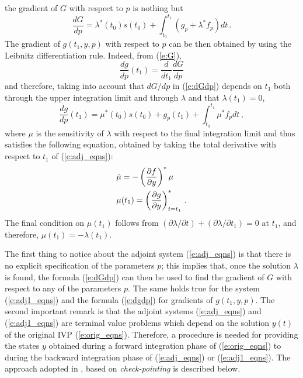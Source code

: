 the gradient of $G$ with respect to $p$ is nothing but
\begin{equation}\label{e:dGdp}
\frac{dG}{dp} = \lambda^*(t_0) s(t_0) + 
\int_{t_0}^{t_1} \left( g_p + \lambda^* f_p \right) dt \, .
\end{equation}
The gradient of $g(t_1,y,p)$ with respect to $p$ can be then obtained
by using the Leibnitz differentiation rule. Indeed, from (\ref{e:G}),
\begin{equation*}
\frac{dg}{dp}(t_1) = \frac{d}{dt_1}\frac{dG}{dp}
\end{equation*}
and therefore, taking into account that $dG/dp$ in (\ref{e:dGdp}) depends on $t_1$
both through the upper integration limit and through $\lambda$ and that $\lambda(t_1) = 0$, 
\begin{equation}\label{e:dgdp}
\frac{dg}{dp}(t_1) = \mu^*(t_0) s(t_0) + g_p(t_1) +
\int_{t_0}^{t_1} \mu^* f_p dt \, ,
\end{equation}
where $\mu$ is the sensitivity of $\lambda$ with respect to the final integration 
limit and thus satisfies the following equation, obtained by taking the total derivative
with respect to $t_1$ of (\ref{e:adj_eqns}):
\begin{equation}\label{e:adj1_eqns}
\begin{split}
&{\dot \mu} = -\left( \frac{\partial f}{\partial y} \right)^* \mu \\ 
&\mu(t_1) = \left( \frac{\partial g}{\partial y} \right)^*_{t=t_1} \, .
\end{split}
\end{equation}
The final condition on $\mu(t_1)$ follows from 
$(\partial\lambda/\partial t) + (\partial\lambda/\partial t_1) = 0$ at $t_1$, and
therefore, $\mu(t_1) = -{\dot\lambda}(t_1)$. 

The first thing to notice about the adjoint system (\ref{e:adj_eqns}) is that there is 
no explicit specification of the parameters $p$; this implies that, once the solution
$\lambda$ is found, the formula (\ref{e:dGdp}) can then be used to find the gradient
of $G$ with respect to any of the parameters $p$. The same holds true for the system
(\ref{e:adj1_eqns}) and the formula (\ref{e:dgdp}) for gradients of $g(t_1,y,p)$. 
The second important remark is that the adjoint systems (\ref{e:adj_eqns}) and
(\ref{e:adj1_eqns}) are terminal value problems which depend on the solution $y(t)$ 
of the original IVP (\ref{e:orig_eqns}). Therefore, a procedure is needed for providing 
the states $y$ obtained during a forward integration phase of (\ref{e:orig_eqns}) to
{\cvodes} during the backward integration phase of (\ref{e:adj_eqns}) or (\ref{e:adj1_eqns}).
The approach adopted in {\cvodes}, based on {\em check-pointing} is described below.

